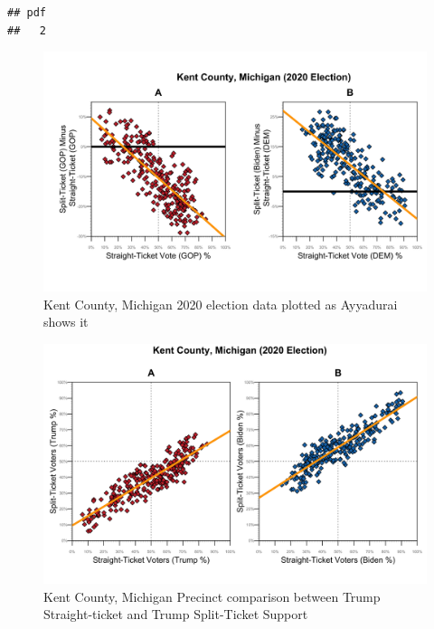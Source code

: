 \documentclass[
]{article}
\begin{document}
\begin{verbatim}
## pdf 
##   2
\end{verbatim}

\begin{figure}
\centering
\includegraphics{images/fig-6-1.png}
\caption{Kent County, Michigan 2020 election data plotted as Ayyadurai
shows it}
\end{figure}

\begin{figure}
\centering
\includegraphics{images/fig-7-1.png}
\caption{Kent County, Michigan Precinct comparison between Trump
Straight-ticket and Trump Split-Ticket Support}
\end{figure}
\end{document}

